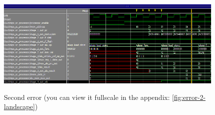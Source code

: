 \begin{figure}[H]
	\caption{Second error (you can view it fullscale in the appendix:
\ref{fig:error-2-landscape})}
	\includegraphics[scale=0.5]{figures/error_2.png}
	\label{fig:error-2-text}
\end{figure}

